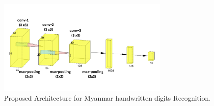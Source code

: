 \vspace{0.5em}
\begin{figure}[h]%
\centering 
\includegraphics[width=0.75\textwidth]{imgs/p2ThidaNet.png}
\caption{Proposed Architecture for Myanmar handwritten digits Recognition.}\label{fig:p2Net}
\end{figure}


